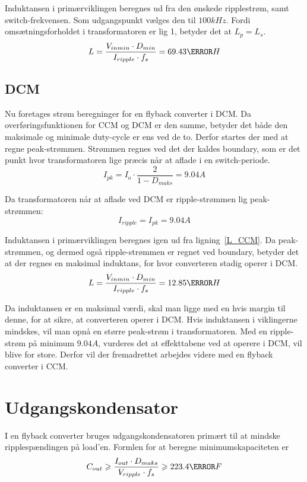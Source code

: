 Induktansen i primærviklingen beregnes ud fra den ønskede ripplestrøm, samt switch-frekvensen. Som udgangspunkt vælges den til $100kHz$. Fordi omsætningsforholdet i transformatoren er lig 1, betyder det at $L_p = L_s$.
\begin{equation} \label{L_CCM}
L = \frac{V_{inmin} \cdot D_{min}}{I_{ripple} \cdot f_s} = 69.43\micro H
\end{equation}

\subsection{DCM}
Nu foretages strøm beregninger for en flyback converter i DCM.
Da overføringsfunktionen for CCM og DCM er den samme, betyder det både den maksimale og minimale duty-cycle er ens ved de to.
Derfor startes der med at regne peak-strømmen. Strømmen regnes ved det der kaldes boundary, som er det punkt hvor transformatoren lige præcis når at aflade i en switch-periode.
\begin{equation} \label{DCM_peak_current}
I_{pk} = I_o \cdot \frac{2}{1-D_{maks}} = 9.04A
\end{equation}

Da transformatoren når at aflade ved DCM er ripple-strømmen lig peak-strømmen:
\begin{equation} \label{DCM_ripple_current}
I_{ripple} = I_{pk} = 9.04A
\end{equation}

Induktansen i primærviklingen beregnes igen ud fra ligning~\ref{L_CCM}. Da peak-strømmen, og dermed også ripple-strømmen er regnet ved boundary, betyder det at der regnes en maksimal induktans, for hvor converteren stadig operer i DCM.
\begin{equation} \label{L_DCM}
L = \frac{V_{inmin} \cdot D_{min}}{I_{ripple} \cdot f_s} = 12.85\micro H
\end{equation}

Da induktansen er en maksimal værdi, skal man ligge med en hvis margin til denne, for at sikre, at converteren operer i DCM. Hvis induktansen i viklingerne mindskes, vil man opnå en større peak-strøm i transformatoren. Med en ripple-strøm på minimum $9.04A$, vurderes det at effekttabene ved at operere i DCM, vil blive for store. Derfor vil der fremadrettet arbejdes videre med en flyback converter i CCM.


\section{Udgangskondensator}
I en flyback converter bruges udgangskondensatoren primært til at mindske ripplespændingen på load'en. Formlen for at beregne minimumskapaciteten er
\begin{equation} \label{udgangskondensator}
C_{out} \geqslant \frac{I_{out} \cdot D_{maks}}{V_{ripple} \cdot f_s} \geqslant 223.4 \micro F
\end{equation}



